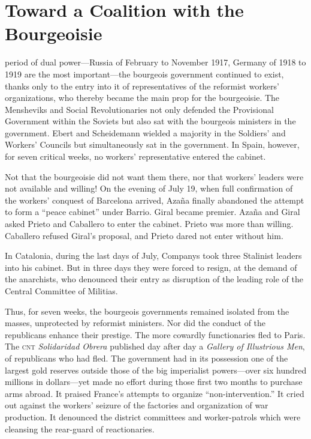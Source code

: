 \chapter{Toward a Coalition with the Bourgeoisie}

 period of dual power---Russia of February to November 1917, Germany of 1918 to 1919 are the most important---the bourgeois government continued to exist, thanks only to the entry into it of representatives of the reformist workers’ organizations, who thereby became the main prop for the bourgeoisie. The Mensheviks and Social Revolutionaries not only defended the Provisional Government within the Soviets but also sat with the bourgeois ministers in the government. Ebert and Scheidemann wielded a majority in the Soldiers’ and Workers’ Councils but simultaneously sat in the government. In Spain, however, for seven critical weeks, no workers’ representative entered the cabinet.

Not that the bourgeoisie did not want them there, nor that workers’ leaders were not available and willing! On the evening of July 19, when full confirmation of the workers’ conquest of Barcelona arrived, Azaña finally abandoned the attempt to form a ``peace cabinet'' under Barrio. Giral became premier. Azaña and Giral asked Prieto and Caballero to enter the cabinet. Prieto was more than willing. Caballero refused Giral’s proposal, and Prieto dared not enter without him.

In Catalonia, during the last days of July, Companys took three Stalinist leaders into his cabinet. But in three days they were forced to resign, at the demand of the anarchists, who denounced their entry as disruption of the leading role of the Central Committee of Militias.

Thus, for seven weeks, the bourgeois governments remained isolated from the masses, unprotected by reformist ministers. Nor did the conduct of the republicans enhance their prestige. The more cowardly functionaries fled to Paris. The \textsc{cnt} \emph{Solidaridad Obrera} published day after day a \emph{Gallery of Illustrious Men}, of republicans who had fled. The government had in its possession one of the largest gold reserves outside those of the big imperialist powers---over six hundred millions in dollars---yet made no effort during those first two months to purchase arms abroad. It praised France’s attempts to organize ``non-intervention.'' It cried out against the workers’ seizure of the factories and organization of war production. It denounced the district committees and worker-patrols which were cleansing the rear-guard of reactionaries.

